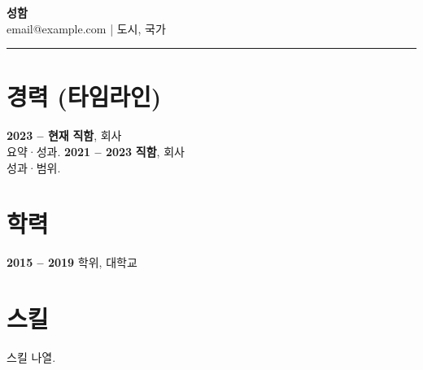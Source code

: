 \documentclass[11pt,a4paper]{article}
\begin{document}
\begin{center}
{\LARGE \textbf{성함}}\\[0.2em]
email@example.com \quad | \quad 도시, 국가
\end{center}
\begin{flushright}\rule{2cm}{2.5cm}\end{flushright}
\vspace{0.6em}
\section*{경력 (타임라인)}
\textbf{2023 -- 현재} \quad \textbf{직함}, 회사 \\
요약·성과.
\vspace{0.3em}
\textbf{2021 -- 2023} \quad \textbf{직함}, 회사 \\
성과·범위.
\vspace{0.5em}
\section*{학력}
\textbf{2015 -- 2019} \quad 학위, 대학교
\section*{스킬}
스킬 나열.
\end{document}
